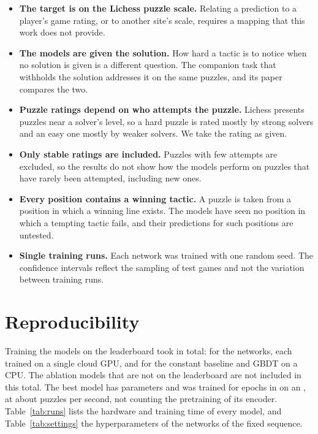 \documentclass[11pt]{article}
\begin{document}
\begin{itemize}
\item \textbf{The target is on the Lichess puzzle scale.} Relating a
prediction to a player's game rating, or to another site's scale, requires a
mapping that this work does not provide.
\item \textbf{The models are given the solution.} How hard a tactic is to
notice when no solution is given is a different question. The companion task
that withholds the solution addresses it on the same puzzles, and its paper
compares the two.
\item \textbf{Puzzle ratings depend on who attempts the puzzle.} Lichess
presents puzzles near a solver's level, so a hard puzzle is rated mostly by
strong solvers and an easy one mostly by weaker solvers. We take the rating
as given.
\item \textbf{Only stable ratings are included.} Puzzles with few attempts
are excluded, so the results do not show how the models perform on puzzles
that have rarely been attempted, including new ones.
\item \textbf{Every position contains a winning tactic.} A puzzle is taken
from a position in which a winning line exists. The models have seen no
position in which a tempting tactic fails, and their predictions for such
positions are untested.
\item \textbf{Single training runs.} Each network was trained with one
random seed. The confidence intervals reflect the sampling of test games and
not the variation between training runs.
\end{itemize}

\section{Reproducibility}
\label{sec:cost}

Training the  models on the leaderboard took 
in total:  for the networks, each trained on a
single cloud GPU, and  for the constant baseline and
GBDT on a CPU. The ablation models that are not on the leaderboard are not
included in this total. The best model has  parameters and
was trained for  epochs in  on an
, at about  puzzles per second, not
counting the pretraining of its encoder. Table~\ref{tab:runs} lists
the hardware and training time of every model, and
Table~\ref{tab:settings} the hyperparameters of the networks of the fixed
sequence.
\end{document}
